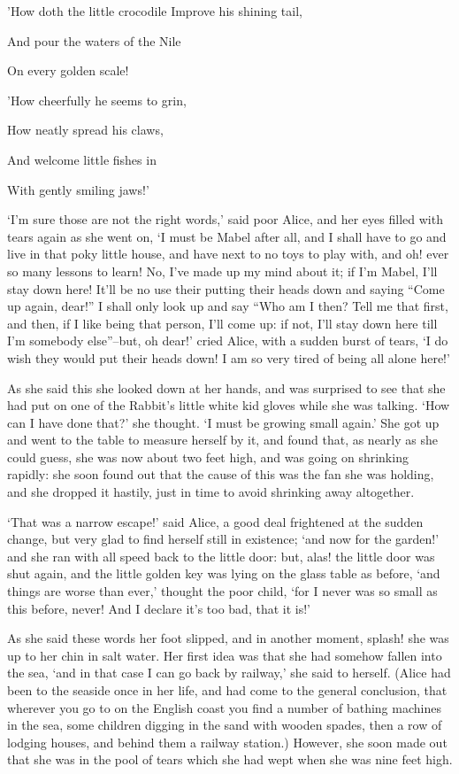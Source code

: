 \documentclass[statementpaper,twoside,openany]{memoir}
\begin{document}
'How doth the little crocodile
Improve his shining tail,

And pour the waters of the Nile

On every golden scale!


'How cheerfully he seems to grin,

How neatly spread his claws,

And welcome little fishes in

With gently smiling jaws!'

`I'm sure those are not the right words,' said poor Alice, and her eyes filled with tears again as she went on, `I must be Mabel after all, and I shall have to go and live in that poky little house, and have next to no toys to play with, and oh! ever so many lessons to learn! No, I've made up my mind about it; if I'm Mabel, I'll stay down here! It'll be no use their putting their heads down and saying ``Come up again, dear!'' I shall only look up and say ``Who am I then? Tell me that first, and then, if I like being that person, I'll come up: if not, I'll stay down here till I'm somebody else''--but, oh dear!' cried Alice, with a sudden burst of tears, `I do wish they would put their heads down! I am so very tired of being all alone here!'

As she said this she looked down at her hands, and was surprised to see that she had put on one of the Rabbit's little white kid gloves while she was talking. `How can I have done that?' she thought. `I must be growing small again.' She got up and went to the table to measure herself by it, and found that, as nearly as she could guess, she was now about two feet high, and was going on shrinking rapidly: she soon found out that the cause of this was the fan she was holding, and she dropped it hastily, just in time to avoid shrinking away altogether.

`That was a narrow escape!' said Alice, a good deal frightened at the sudden change, but very glad to find herself still in existence; `and now for the garden!' and she ran with all speed back to the little door: but, alas! the little door was shut again, and the little golden key was lying on the glass table as before, `and things are worse than ever,' thought the poor child, `for I never was so small as this before, never! And I declare it's too bad, that it is!'

As she said these words her foot slipped, and in another moment, splash! she was up to her chin in salt water. Her first idea was that she had somehow fallen into the sea, `and in that case I can go back by railway,' she said to herself. (Alice had been to the seaside once in her life, and had come to the general conclusion, that wherever you go to on the English coast you find a number of bathing machines in the sea, some children digging in the sand with wooden spades, then a row of lodging houses, and behind them a railway station.) However, she soon made out that she was in the pool of tears which she had wept when she was nine feet high.
\end{document}
